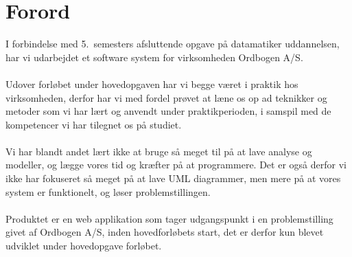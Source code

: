 \section{Forord}
I forbindelse med 5.\ semesters afsluttende opgave på datamatiker uddannelsen, har vi udarbejdet et software system for virksomheden Ordbogen A/S.
\\\\
Udover forløbet under hovedopgaven har vi begge været i praktik hos virksomheden, derfor har vi med fordel prøvet at læne os op ad teknikker og metoder
som vi har lært og anvendt under praktikperioden, i samspil med de kompetencer vi har tilegnet os på studiet.
\\\\
Vi har blandt andet lært ikke at bruge så meget til på at lave analyse og modeller, og lægge vores tid og kræfter på at programmere.
Det er også derfor vi ikke har fokuseret så meget på at lave UML diagrammer, men mere på at vores system er funktionelt, og løser problemstillingen.
\\\\
Produktet er en web applikation som tager udgangspunkt i en problemstilling givet af Ordbogen A/S, inden hovedforløbets start, det er derfor kun blevet udviklet under
hovedopgave forløbet.
